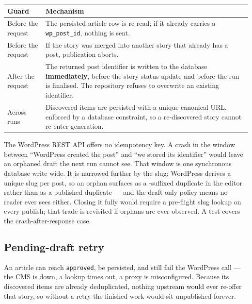 \documentclass[11pt,a4paper]{article}
\newcommand{\brk}{\hyphenpenalty=0\exhyphenpenalty=0\relax}
\newcommand{\code}[1]{\texttt{\small\brk #1}}
\begin{document}
\begin{center}
\small
\begin{tabularx}{\textwidth}{@{}p{3.1cm} >{\RaggedRight}X@{}}
\toprule
\textbf{Guard} & \textbf{Mechanism} \\
\midrule
Before the request & The persisted article row is re-read; if it already carries a
  \code{wp\_post\_id}, nothing is sent. \\
Before the request & If the story was merged into another story that already has a
  post, publication aborts. \\
After the request & The returned post identifier is written to the database
  \textbf{immediately}, before the story status update and before the run is
  finalised. The repository refuses to overwrite an existing identifier. \\
Across runs & Discovered items are persisted with a unique canonical URL, enforced
  by a database constraint, so a re-discovered story cannot re-enter generation. \\
\bottomrule
\end{tabularx}
\end{center}

\begin{infobox}
The WordPress REST API offers no idempotency key. A crash in the window between
``WordPress created the post'' and ``we stored its identifier'' would leave an
orphaned draft the next run cannot see. That window is one synchronous database
write wide. It is narrowed further by the slug: WordPress derives a unique slug per
post, so an orphan surfaces as a \code{-2}-suffixed duplicate in the editor rather
than as a published duplicate --- and the draft-only policy means no reader ever
sees either. Closing it fully would require a pre-flight slug lookup on every
publish; that trade is revisited if orphans are ever observed. A test covers the
crash-after-response case.
\end{infobox}

\subsection{Pending-draft retry}

An article can reach \code{approved}, be persisted, and still fail the WordPress
call --- the CMS is down, a lookup times out, a proxy is misconfigured. Because its
discovered items are already deduplicated, nothing upstream would ever re-offer
that story, so without a retry the finished work would sit unpublished forever.
\end{document}
